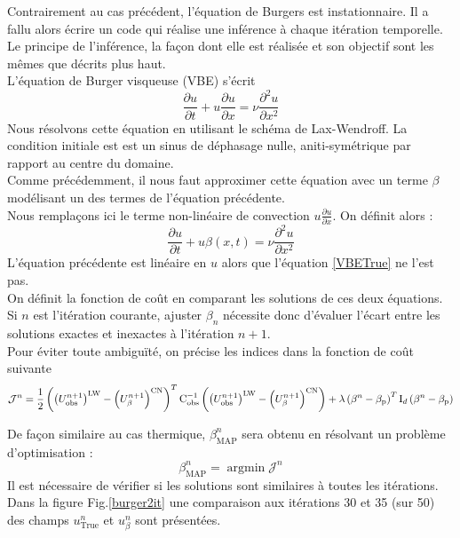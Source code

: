 \documentclass[a4paper,12pt]{article}
\newcommand{\argmin}{\mathop{\mathrm{argmin}}}
\newcommand{\bepar}[1]{
	\left( #1 \right)  
}
\newcommand{\bmap}{\beta_{\text{MAP}}}
\numberwithin{equation}{section} %
\begin{document}
\noindent Contrairement au cas précédent, l'équation de Burgers est instationnaire. Il a fallu alors écrire un code qui réalise une inférence à chaque itération temporelle. Le principe de l'inférence, la façon dont elle est réalisée et son objectif sont les mêmes que décrits plus haut.\\
\noindent L'équation de Burger visqueuse (VBE) s'écrit 
\begin{equation}
\frac{\partial u}{\partial t} + u \frac{\partial u}{\partial x} = \nu\frac{\partial^2 u}{\partial x^2}  \label{VBETrue} \tag{VBE}
\end{equation}
Nous résolvons cette équation en utilisant le schéma de Lax-Wendroff. La condition initiale est est un sinus de déphasage nulle, aniti-symétrique par rapport au centre du domaine.\\
Comme précédemment, il nous faut approximer cette équation avec un terme $\beta$ modélisant un des termes de l'équation précédente. \\
Nous remplaçons ici le terme non-linéaire de convection $\displaystyle u \frac{\partial u}{\partial x}$. On définit alors :
\begin{equation}
\frac{\partial u}{\partial t} + u \beta(x,t) = \nu \frac{\partial^2 u}{\partial x^2} \label{VBEbeta} \tag{VBE$\beta$}
\end{equation}
L'équation précédente est linéaire en $u$ alors que l'équation \eqref{VBETrue} ne l'est pas.\\
On définit la fonction de coût en comparant les solutions de ces deux équations. Si $n$ est l'itération courante, ajuster $\beta_n$ nécessite donc d'évaluer l'écart entre les solutions exactes et inexactes à l'itération $n+1$.\\
Pour éviter toute ambiguïté, on précise les indices dans la fonction de coût suivante 
\begin{equation}
\mathcal{J}^n = \frac{1}{2} \bepar{\bepar{U^{n+1}_{\text{obs}}}^\text{LW} - \bepar{U^{n+1}_\beta}^\text{CN}}^T \text{C}_\text{obs}^{-1} \bepar{\bepar{U^{n+1}_{\text{obs}}}^\text{LW} - \bepar{U^{n+1}_\beta}^\text{CN}} + \\ \lambda \bepar{\beta^n -
			\beta_{\text{p}}}^T \text{I}_d \bepar{\beta^n - \beta_\text{p}}
\end{equation}

\vspace{5mm}
\noindent De façon similaire au cas thermique, $\bmap^{n}$ sera obtenu en résolvant un problème d'optimisation :
\begin{equation}
\beta_{\text{MAP}}^n = \argmin \mathcal{J}^n
\end{equation}
Il est nécessaire de vérifier si les solutions sont similaires à toutes les itérations. Dans la figure Fig.\eqref{burger2it} une comparaison aux itérations 30 et 35 (sur 50) des champs $u^n_{\text{True}}$ et $u^n_{\beta}$ sont présentées. \\
\end{document}
